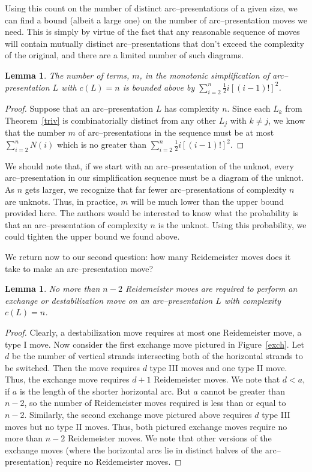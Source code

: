 \documentclass{amsart}
\newtheorem{lemma}[theorem]{Lemma}
\begin{document}
Using this count on the number of distinct arc--presentations of a given size, we can find a bound (albeit a large one) on the number of arc--presentation moves we need. This is simply by virtue of the fact that any reasonable sequence of moves will contain mutually distinct arc--presentations that don't exceed the complexity of the original, and there are a limited number of such diagrams.

\begin{lemma}\label{size}
The number of terms, $m$, in the monotonic simplification of arc--presentation $L$ with $c(L)=n$ is bounded above by $\sum_{i=2}^n\frac{1}{2}i[(i-1)!]^2$.
\end{lemma}
\begin{proof}
Suppose that an arc--presentation $L$ has complexity $n$. Since each $L_k$ from Theorem~\ref{triv} is combinatorially distinct from any other $L_j$ with $k\neq j$, we know that the number $m$ of arc--presentations in the sequence must be at most $\sum_{i=2}^nN(i)$ which is no greater than $\sum_{i=2}^n\frac{1}{2}i[(i-1)!]^2$. 
\end{proof}

We should note that, if we start with an arc--presentation of the unknot, every arc--presentation in our simplification sequence must be a diagram of the unknot. As $n$ gets larger, we recognize that far fewer arc--presentations of complexity $n$ are unknots. Thus, in practice, $m$ will be much lower than the upper bound provided here. The authors would be interested to know what the probability is that an arc--presentation of complexity $n$ is the unknot. Using this probability, we could tighten the upper bound we found above.

We return now to our second question: how many Reidemeister moves does it take to make an arc--presentation move?

\begin{lemma}\label{reid}
No more than $n-2$ Reidemeister moves are required to perform an exchange or destabilization move on an arc--presentation $L$ with complexity $c(L)=n$.
\end{lemma}
\begin{proof}
Clearly, a destabilization move requires at most one Reidemeister move, a type I move. Now consider the first exchange move pictured in Figure~\ref{exch}. Let $d$ be the number of vertical strands intersecting both of the horizontal strands to be switched. Then the move requires $d$ type III moves and one type II move. Thus, the exchange move requires $d+1$ Reidemeister moves. We note that $d<a$, if $a$ is the length of the shorter horizontal arc. But $a$ cannot be greater than $n-2$, so the number of Reidemeister moves required is less than or equal to $n-2$. Similarly, the second exchange move pictured above requires $d$ type III moves but no type II moves. Thus, both pictured exchange moves require no more than $n-2$ Reidemeister moves. We note that other versions of the exchange moves (where the horizontal arcs lie in distinct halves of the arc--presentation) require no Reidemeister moves. 
\end{proof}
\end{document}
